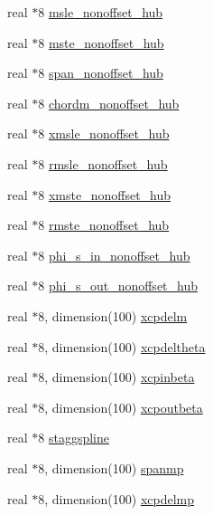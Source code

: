 \begin{DoxyCompactItemize}
\item 
real $\ast$8 \hyperlink{namespaceglobvar_ab5a7740414d3a3f3b79672f336f4ed83}{msle\+\_\+nonoffset\+\_\+hub}
\item 
real $\ast$8 \hyperlink{namespaceglobvar_af4bd45dc8527c82a602975482604fdb1}{mste\+\_\+nonoffset\+\_\+hub}
\item 
real $\ast$8 \hyperlink{namespaceglobvar_a6cfba7e55403bb754be3f594a4d00d32}{span\+\_\+nonoffset\+\_\+hub}
\item 
real $\ast$8 \hyperlink{namespaceglobvar_a0af19e0c5bd151072f235940d7e08b48}{chordm\+\_\+nonoffset\+\_\+hub}
\item 
real $\ast$8 \hyperlink{namespaceglobvar_ac7ab2bdf56cf49943a096e1376844993}{xmsle\+\_\+nonoffset\+\_\+hub}
\item 
real $\ast$8 \hyperlink{namespaceglobvar_a5237bcbafe8fc6ccd929edfff7448b15}{rmsle\+\_\+nonoffset\+\_\+hub}
\item 
real $\ast$8 \hyperlink{namespaceglobvar_aafc2848897bd0aa446e292955157bb99}{xmste\+\_\+nonoffset\+\_\+hub}
\item 
real $\ast$8 \hyperlink{namespaceglobvar_ac10c9231253c0f30759eab0d2614b736}{rmste\+\_\+nonoffset\+\_\+hub}
\item 
real $\ast$8 \hyperlink{namespaceglobvar_a1f20572185fb4ba6325b2158c570f2b8}{phi\+\_\+s\+\_\+in\+\_\+nonoffset\+\_\+hub}
\item 
real $\ast$8 \hyperlink{namespaceglobvar_ae4db55071c0a99b6d91729452cf5e5bc}{phi\+\_\+s\+\_\+out\+\_\+nonoffset\+\_\+hub}
\item 
real $\ast$8, dimension(100) \hyperlink{namespaceglobvar_a7da205f9d2f93c70b889e9da9c9ac03a}{xcpdelm}
\item 
real $\ast$8, dimension(100) \hyperlink{namespaceglobvar_a53a66282b3eaeda7202704473994f279}{xcpdeltheta}
\item 
real $\ast$8, dimension(100) \hyperlink{namespaceglobvar_ade9c76fcb375c4e5d05a6d9c04c1dbfe}{xcpinbeta}
\item 
real $\ast$8, dimension(100) \hyperlink{namespaceglobvar_aa9e6a5ee3e0ace429ff2ebc6f8c04ed2}{xcpoutbeta}
\item 
real $\ast$8 \hyperlink{namespaceglobvar_abf2b9f230322f087169e3c845b003237}{staggspline}
\item 
real $\ast$8, dimension(100) \hyperlink{namespaceglobvar_a9e37b92991bd90ec55563a14f0405156}{spanmp}
\item 
real $\ast$8, dimension(100) \hyperlink{namespaceglobvar_ad1fdc8c08d0045d1d9088325d56d0a7f}{xcpdelmp}
\item 

\end{DoxyCompactItemize}
